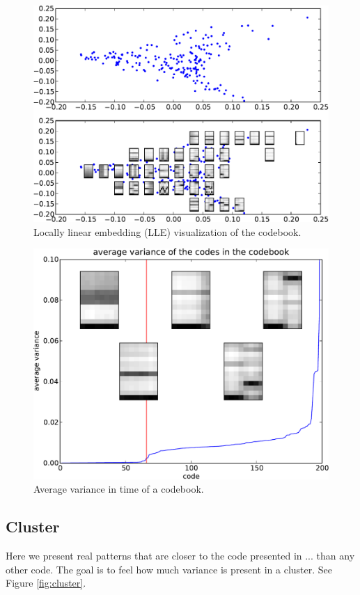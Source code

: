 \documentclass{article}
\begin{document}
\begin{figure}[htb]
\begin{center}
\includegraphics[width=.9\columnwidth]{codes_lle}
\end{center}
\caption{\small{Locally linear embedding (LLE) visualization of the codebook.}}
\label{fig:lle}
\end{figure}

\begin{figure}[htb]
\begin{center}
\includegraphics[width=.9\columnwidth]{code_variance}
\end{center}
\caption{\small{Average variance in time of a codebook.}}
\label{fig:code_var}
\end{figure}

\subsection{Cluster}
Here we present real patterns that are closer to the code presented in ...
than any other code. The goal is to feel how much variance is present in
a cluster. See Figure \ref{fig:cluster}.
\end{document}
